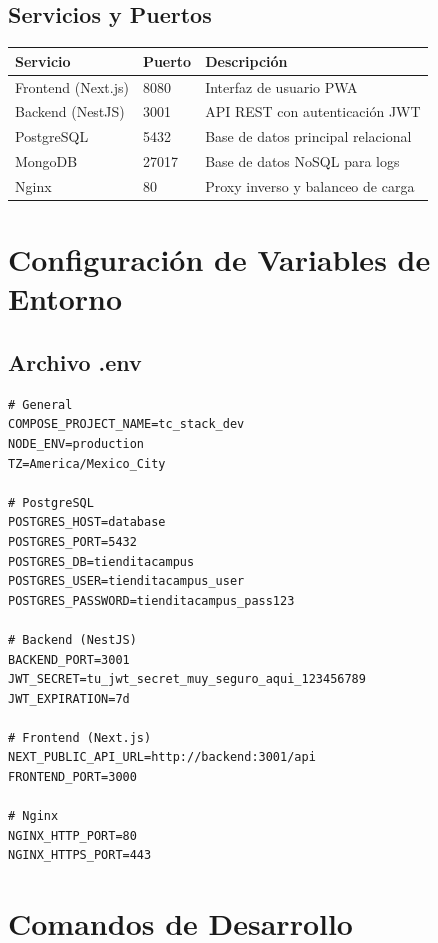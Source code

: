 \documentclass[12pt,a4paper]{article}
\begin{document}
\subsection{Servicios y Puertos}

\begin{tabular}{|l|l|l|}
\hline
\textbf{Servicio} & \textbf{Puerto} & \textbf{Descripción} \\
\hline
Frontend (Next.js) & 8080 & Interfaz de usuario PWA \\
Backend (NestJS) & 3001 & API REST con autenticación JWT \\
PostgreSQL & 5432 & Base de datos principal relacional \\
MongoDB & 27017 & Base de datos NoSQL para logs \\
Nginx & 80 & Proxy inverso y balanceo de carga \\
\hline
\end{tabular}

\section{Configuración de Variables de Entorno}

\subsection{Archivo .env}
\begin{lstlisting}[caption=.env - Variables de Entorno]
# General
COMPOSE_PROJECT_NAME=tc_stack_dev
NODE_ENV=production
TZ=America/Mexico_City

# PostgreSQL
POSTGRES_HOST=database
POSTGRES_PORT=5432
POSTGRES_DB=tienditacampus
POSTGRES_USER=tienditacampus_user
POSTGRES_PASSWORD=tienditacampus_pass123

# Backend (NestJS)
BACKEND_PORT=3001
JWT_SECRET=tu_jwt_secret_muy_seguro_aqui_123456789
JWT_EXPIRATION=7d

# Frontend (Next.js)
NEXT_PUBLIC_API_URL=http://backend:3001/api
FRONTEND_PORT=3000

# Nginx
NGINX_HTTP_PORT=80
NGINX_HTTPS_PORT=443
\end{lstlisting}

\section{Comandos de Desarrollo}
\end{document}
